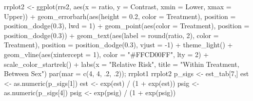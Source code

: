 \documentclass[12pt]{article}
\newenvironment{Shaded}{\begin{snugshade}}{\end{snugshade}}
\newcommand{\AttributeTok}[1]{\textcolor[rgb]{0.77,0.63,0.00}{#1}}
\newcommand{\DecValTok}[1]{\textcolor[rgb]{0.00,0.00,0.81}{#1}}
\newcommand{\FloatTok}[1]{\textcolor[rgb]{0.00,0.00,0.81}{#1}}
\newcommand{\FunctionTok}[1]{\textcolor[rgb]{0.00,0.00,0.00}{#1}}
\newcommand{\NormalTok}[1]{#1}
\newcommand{\OtherTok}[1]{\textcolor[rgb]{0.56,0.35,0.01}{#1}}
\newcommand{\SpecialCharTok}[1]{\textcolor[rgb]{0.00,0.00,0.00}{#1}}
\newcommand{\StringTok}[1]{\textcolor[rgb]{0.31,0.60,0.02}{#1}}
\begin{document}
\begin{Shaded}
\begin{Highlighting}[]
\NormalTok{rrplot2 }\OtherTok{\textless{}{-}} \FunctionTok{ggplot}\NormalTok{(rrs2, }\FunctionTok{aes}\NormalTok{(}\AttributeTok{x =}\NormalTok{ ratio, }\AttributeTok{y =}\NormalTok{ Contrast, }\AttributeTok{xmin =}\NormalTok{ Lower, }\AttributeTok{xmax =}\NormalTok{ Upper)) }\SpecialCharTok{+}
  \FunctionTok{geom\_errorbarh}\NormalTok{(}\FunctionTok{aes}\NormalTok{(}\AttributeTok{height =} \FloatTok{0.2}\NormalTok{, }\AttributeTok{color =}\NormalTok{ Treatment),}
                 \AttributeTok{position =} \FunctionTok{position\_dodge}\NormalTok{(}\FloatTok{0.3}\NormalTok{), }\AttributeTok{lwd =} \DecValTok{1}\NormalTok{) }\SpecialCharTok{+}
  \FunctionTok{geom\_point}\NormalTok{(}\FunctionTok{aes}\NormalTok{(}\AttributeTok{color =}\NormalTok{ Treatment), }\AttributeTok{position =} \FunctionTok{position\_dodge}\NormalTok{(}\FloatTok{0.3}\NormalTok{)) }\SpecialCharTok{+}
  \FunctionTok{geom\_text}\NormalTok{(}\FunctionTok{aes}\NormalTok{(}\AttributeTok{label =} \FunctionTok{round}\NormalTok{(ratio, }\DecValTok{2}\NormalTok{), }\AttributeTok{color =}\NormalTok{ Treatment), }
            \AttributeTok{position =} \FunctionTok{position\_dodge}\NormalTok{(}\FloatTok{0.3}\NormalTok{), }\AttributeTok{vjust =} \SpecialCharTok{{-}}\DecValTok{1}\NormalTok{) }\SpecialCharTok{+}
  \FunctionTok{theme\_light}\NormalTok{() }\SpecialCharTok{+}
  \FunctionTok{geom\_vline}\NormalTok{(}\FunctionTok{aes}\NormalTok{(}\AttributeTok{xintercept =} \DecValTok{1}\NormalTok{), }\AttributeTok{color =} \StringTok{"\#FFCD00FF"}\NormalTok{, }\AttributeTok{lty =} \DecValTok{2}\NormalTok{) }\SpecialCharTok{+}
  \FunctionTok{scale\_color\_startrek}\NormalTok{() }\SpecialCharTok{+}
  \FunctionTok{labs}\NormalTok{(}\AttributeTok{x =} \StringTok{"Relative Risk"}\NormalTok{, }\AttributeTok{title =} \StringTok{"Within Treatment, Between Sex"}\NormalTok{)}
\FunctionTok{par}\NormalTok{(}\AttributeTok{mar =} \FunctionTok{c}\NormalTok{(}\DecValTok{4}\NormalTok{, }\DecValTok{4}\NormalTok{, .}\DecValTok{2}\NormalTok{, .}\DecValTok{2}\NormalTok{));}
\NormalTok{rrplot1}
\NormalTok{rrplot2}
\NormalTok{p\_sigs }\OtherTok{\textless{}{-}}\NormalTok{ est\_tab[}\DecValTok{7}\NormalTok{,]}
\NormalTok{est }\OtherTok{\textless{}{-}} \FunctionTok{as.numeric}\NormalTok{(p\_sigs[}\DecValTok{1}\NormalTok{])}
\NormalTok{est }\OtherTok{\textless{}{-}} \FunctionTok{exp}\NormalTok{(est) }\SpecialCharTok{/}\NormalTok{ (}\DecValTok{1} \SpecialCharTok{+} \FunctionTok{exp}\NormalTok{(est)) }
\NormalTok{psig }\OtherTok{\textless{}{-}} \FunctionTok{as.numeric}\NormalTok{(p\_sigs[}\DecValTok{4}\NormalTok{])}
\NormalTok{psig }\OtherTok{\textless{}{-}} \FunctionTok{exp}\NormalTok{(psig) }\SpecialCharTok{/}\NormalTok{ (}\DecValTok{1} \SpecialCharTok{+} \FunctionTok{exp}\NormalTok{(psig))}

\end{Highlighting}
\end{Shaded}
\end{document}
